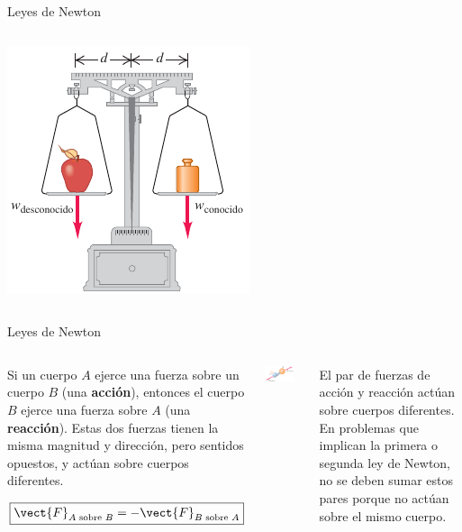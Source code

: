 \documentclass[9pt, aspectratio=169]{beamer}
\begin{document}
\begin{frame}{Leyes de Newton}
\begin{columns}
\begin{center}
    \includegraphics[scale=0.35]{figs/fig-10}
\end{center}
\end{columns}
\end{frame}

\begin{frame}{Leyes de Newton}
\begin{columns}
\cx 
\begin{definition}
    Si un cuerpo $A$ ejerce una fuerza sobre un cuerpo $B$ (una \textbf{acción}), entonces el cuerpo $B$ ejerce una fuerza sobre $A$ (una \textbf{reacción}). Estas dos fuerzas tienen la misma magnitud y dirección, pero sentidos opuestos, y actúan sobre \alert{cuerpos diferentes}.

    \[ \boxed{\vect{F}_{A \text{ sobre } B} = - \vect{F}_{B \text{ sobre } A}} \]
\end{definition}

\cx 
\begin{center}
    \includegraphics[width=0.8\textwidth]{figs/fig-11.png}
\end{center}

\begin{alertblock}{\centering \faExclamationTriangle}
    El par de fuerzas de acción y reacción actúan \alert{sobre cuerpos diferentes}. En problemas que implican la primera o segunda ley de Newton, no se deben sumar estos pares porque no actúan sobre el mismo cuerpo.
\end{alertblock}
\end{columns}
\end{frame}
\end{document}
